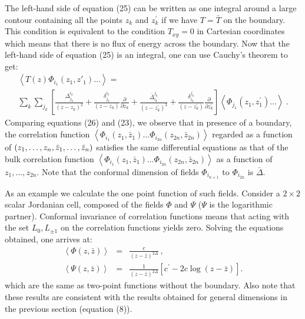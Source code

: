 The left-hand side of equation (25) can be written as one integral around a large
contour containing all the points $z_{k}$ and $z^{\prime}_{k}$ if we have $T=\bar{T}$ on the boundary.
This condition is equivalent to the 
condition $T_{xy}=0$ in Cartesian coordinates which means that there is no flux 
of energy across the boundary. Now that the left-hand side of equation (25) is an integral,
one can use Cauchy's theorem to get:
\begin{eqnarray}
\left<T(z)\Phi_{i_{1}}(z_{1},{z'}_{1})\ldots\right>=
\:\:\:\:\:\:\:\:\:\:\:\:\:\:\:\:\:\:\:\:\:\:\:\:\:\:\:\:\:\:\:\:\:\:\:\:\:\:\:\:\:
\:\:\:\:\:\:\:\:\:\:\:\:\:\:\:\:\:\:\:\:\:\:\:\:\:\:\:\:\:\:\:\:\:\:\:\:\:\:\:\nonumber\\
\sum_{k}\sum_{j_{k}}\left[\frac {\Delta^{i_{k}}_{j_{k}}}{(z-z_{k})^{2}}+
\frac {\delta^{i_{k}}_{j_{k}}}{(z-z_{k})}\frac {\partial}{\partial{z_{k}}}
+\frac {{\bar{\Delta}}^{j_{k}}_{i_{k}}}{(z-z^{\prime}_{k})^{2}}
+\frac {\delta^{j_{k}}_{i_{k}}}{(z-z^{\prime}_{k})}
\frac {\partial}{\partial{z^{\prime}_{k}}}\right]
\left<\Phi_{j_{1}}(z_{1},z^{\prime}_{1})\ldots\right>\:.
\end{eqnarray}
Comparing equations (26) and (23), we observe that in presence of a boundary, the
correlation function
$\left<\Phi_{i_{1}}(z_{1},\bar{z}_{1})
\ldots\Phi_{i_{2n}}(z_{2n},\bar{z}_{2n})\right>$
regarded as a function of $(z_{1},\ldots,z_{n},\newline
{\bar{z}}_{1},\ldots,{\bar{z}}_{n})$
satisfies the same differential equations as that of the bulk correlation
function
$\left<\Phi_{i_{1}}(z_{1},{\bar{z}}_{1})\ldots\Phi_{i_{2n}}(z_{2n},{\bar{z}}_{2n})\right>$ 
as a function of $z_{1},\ldots,z_{2n}$. Note that the conformal dimension of fields
$\Phi_{i_{n+1}}$ to $\Phi_{i_{2n}}$
is $\bar{\Delta}$.

As an example we calculate the one point function of such fields.
Consider a $2 \times 2$ scalar Jordanian cell, composed of the fields $\Phi$ and $\Psi$
($\Psi$ is the logarithmic partner).
Conformal invariance of
correlation functions means that acting with the set ${L_{0},L_{\pm{1}}}$
on the correlation functions yields zero.
Solving the equations obtained, one arrives at:
\begin{eqnarray}
\left<\Phi(z,\bar{z})\right>&=&\frac{c}{(z-\bar{z})^{2\Delta}}\:,\nonumber\\
\left<\Psi(z,\bar{z})\right>&=&\frac 1{(z-\bar{z})^{2\Delta}}
\left[c^{\prime}-2c\log{(z-\bar{z})}\right].
\end{eqnarray}
which are the same as two-point functions without the boundary. Also note that these results are
consistent with the results obtained for general dimensions in the previous section (equation (8)).

